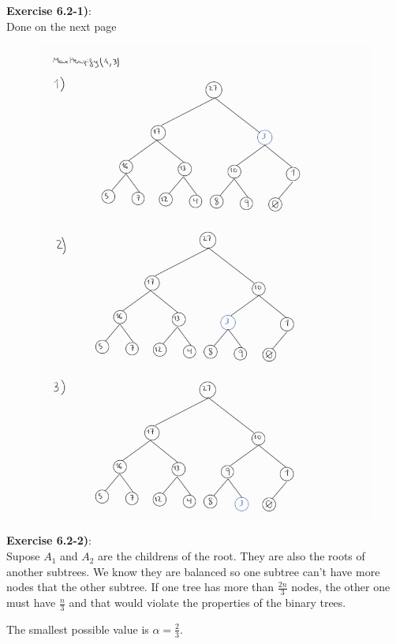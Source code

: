 \documentclass{article}
\newcounter{exercise}[section]   %
\begin{document}
\textbf{Exercise 6.2-1)}:\\
Done on the next page
\newpage
\begin{figure}[h]
    \centering
    \includegraphics[scale=0.25]{Problem6_2_1.jpeg}
\end{figure}

\textbf{Exercise 6.2-2)}:\\
Supose \(A_1\) and \(A_2\) are the childrens of the root. They are also the roots of another 
subtrees. We know they are balanced so one subtree can't have more nodes that the other subtree.
If one tree has more than \(\frac{2n}{3}\) nodes, the other one must have \(\frac{n}{3}\) and
that would violate the properties of the binary trees. 

The smallest possible value is \(\alpha = \frac{2}{3}\). 
\end{document}
